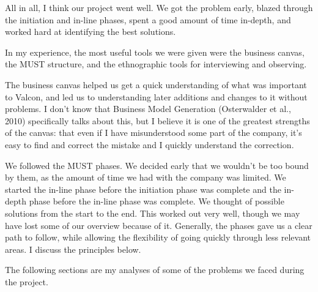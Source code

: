 All in all, I think our project went well.
We got the problem early, blazed through the initiation and in-line phases, spent a good amount of time in-depth, and worked hard at identifying the best solutions.

In my experience, the most useful tools we were given were the business canvas, the MUST structure, and the ethnographic tools for interviewing and observing.

The business canvas helped us get a quick understanding of what was important to Valcon, and led us to understanding later additions and changes to it without problems.
I don't know that Business Model Generation (Osterwalder et al., 2010) specifically talks about this, but I believe it is one of the greatest strengths of the canvas: that even if I have misunderstood some part of the company, it's easy to find and correct the mistake and I quickly understand the correction.

We followed the MUST phases.
We decided early that we wouldn't be too bound by them, as the amount of time we had with the company was limited.
We started the in-line phase before the initiation phase was complete and the in-depth phase before the in-line phase was complete.
We thought of possible solutions from the start to the end.
This worked out very well, though we may have lost some of our overview because of it.
Generally, the phases gave us a clear path to follow, while allowing the flexibility of going quickly through less relevant areas.
I discuss the principles below.

The following sections are my analyses of some of the problems we faced during the project.